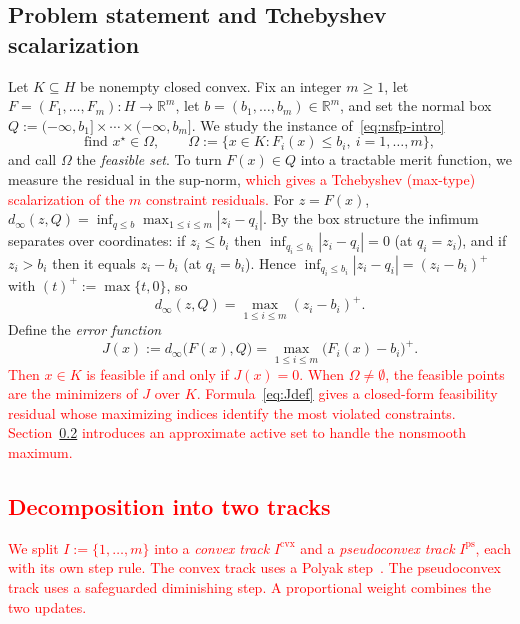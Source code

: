 \documentclass[]{interact}
\theoremstyle{plain}
\theoremstyle{definition}
\theoremstyle{remark}
\newcommand{\R}{\mathbb{R}}
\newcommand{\abs}[1]{\left\lvert #1 \right\rvert}
\newcommand{\cvx}{\mathrm{cvx}}
\newcommand{\ps}{\mathrm{ps}}
\begin{document}
\subsection{Problem statement and Tchebyshev scalarization}\label{ssec:model-stmt}
Let $K\subseteq H$ be nonempty closed convex. Fix an integer $m\ge1$, let $F=(F_1,\dots,F_m):H\to\R^m$, let $b=(b_1,\dots,b_m)\in\R^m$, and set the normal box $Q:=(-\infty,b_1]\times\cdots\times(-\infty,b_m]$. We study the instance of~\eqref{eq:nsfp-intro}
\begin{equation}\label{eq:nsfp-box}
\text{find } x^\star\in\Omega,\qquad
\Omega:=\bigl\{x\in K: F_i(x)\le b_i,\ i=1,\dots,m\bigr\},
\end{equation}
and call $\Omega$ the \emph{feasible set}. To turn $F(x)\in Q$ into a tractable merit function, we measure the residual in the sup-norm, \leavevmode\textcolor{red}{which gives a Tchebyshev (max-type) scalarization of the $m$ constraint residuals.} For $z=F(x)$, $d_\infty(z,Q)=\inf_{q\le b}\max_{1\le i\le m}\abs{z_i-q_i}$. By the box structure the infimum separates over coordinates: if $z_i\le b_i$ then $\inf_{q_i\le b_i}\abs{z_i-q_i}=0$ (at $q_i=z_i$), and if $z_i>b_i$ then it equals $z_i-b_i$ (at $q_i=b_i$). Hence $\inf_{q_i\le b_i}\abs{z_i-q_i}=(z_i-b_i)^+$ with $(t)^+:=\max\{t,0\}$, so
\begin{equation}\label{eq:dinfty}
d_\infty(z,Q)=\max_{1\le i\le m}(z_i-b_i)^+ .
\end{equation}
Define the \emph{error function}
\begin{equation}\label{eq:Jdef}
J(x):=d_\infty\bigl(F(x),Q\bigr)=\max_{1\le i\le m}\bigl(F_i(x)-b_i\bigr)^+ .
\end{equation}
\leavevmode\textcolor{red}{Then $x\in K$ is feasible if and only if $J(x)=0$. When $\Omega\ne\emptyset$, the feasible points are the minimizers of $J$ over $K$. Formula~\eqref{eq:Jdef} gives a closed-form feasibility residual whose maximizing indices identify the most violated constraints. Section~\ref{ssec:dual-track} introduces an approximate active set to handle the nonsmooth maximum.}

\subsection{\textcolor{red}{Decomposition into two tracks}}\label{ssec:dual-track}
\leavevmode\textcolor{red}{We split $I:=\{1,\dots,m\}$ into a \emph{convex track} $I^{\cvx}$ and a \emph{pseudoconvex track} $I^{\ps}$, each with its own step rule. The convex track uses a Polyak step~\citep{polyak1969}. The pseudoconvex track uses a safeguarded diminishing step. A proportional weight combines the two updates.}
\end{document}
